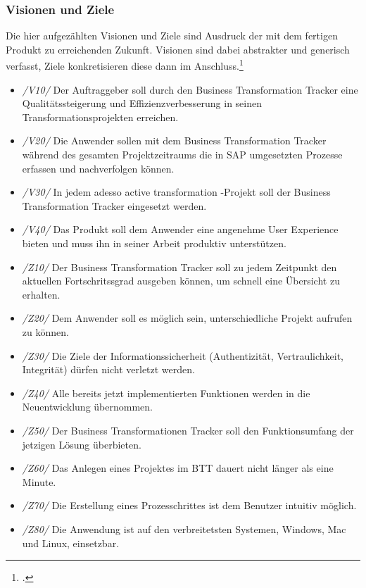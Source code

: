 \subsubsection{Visionen und Ziele}
Die hier aufgezählten Visionen und Ziele sind Ausdruck der mit dem fertigen Produkt zu erreichenden Zukunft. Visionen sind dabei abstrakter und generisch verfasst, Ziele konkretisieren diese dann im Anschluss.\footcite[Vgl.][S. 457]{balzert}
\begin{itemize}
    \item[] \emph{/V10/} Der Auftraggeber soll durch den Business Transformation Tracker eine Qualitätssteigerung und Effizienzverbesserung in seinen Transformationsprojekten erreichen.
    \item[] \emph{/V20/} Die Anwender sollen mit dem Business Transformation Tracker während des gesamten Projektzeitraums die in SAP umgesetzten Prozesse erfassen und nachverfolgen können.
    \item[] \emph{/V30/} In jedem adesso active transformation -Projekt soll der Business Transformation Tracker eingesetzt werden.
    \item[] \emph{/V40/} Das Produkt soll dem Anwender eine angenehme User Experience bieten und muss ihn in seiner Arbeit produktiv unterstützen.\\
\end{itemize}

\begin{itemize} 
    \item[] \emph{/Z10/} Der Business Transformation Tracker soll zu jedem Zeitpunkt den aktuellen Fortschritssgrad ausgeben können, um schnell eine Übersicht zu erhalten.
    \item[] \emph{/Z20/} Dem Anwender soll es möglich sein, unterschiedliche Projekt aufrufen zu können.
    \item[] \emph{/Z30/} Die Ziele der Informationssicherheit (Authentizität, Vertraulichkeit, Integrität) dürfen nicht verletzt werden.
    \item[] \emph{/Z40/} Alle bereits jetzt implementierten Funktionen werden in die Neuentwicklung übernommen.         
    \item[] \emph{/Z50/} Der Business Transformationen Tracker soll den Funktionsumfang der jetzigen Lösung überbieten.  
    \item[] \emph{/Z60/} Das Anlegen eines Projektes im BTT dauert nicht länger als eine Minute.
    \item[] \emph{/Z70/} Die Erstellung eines Prozesschrittes ist dem Benutzer intuitiv möglich.
    \item[] \emph{/Z80/} Die Anwendung ist auf den verbreitetsten Systemen, Windows, Mac und Linux, einsetzbar.
\end{itemize}

